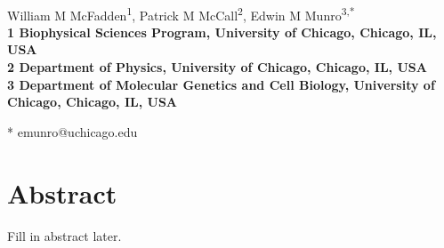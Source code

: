 \documentclass[10pt,letterpaper]{article}
\date{}
\begin{document}
\vspace*{0.35in}

\begin{flushleft}
{\Large
\textbf{}
}
\newline
\\
William M McFadden\textsuperscript{1},
Patrick M McCall\textsuperscript{2},
Edwin M Munro\textsuperscript{3,*}
\\
\bigskip
\bf{1} Biophysical Sciences Program, University of Chicago, Chicago, IL, USA
\\
\bf{2} Department of Physics, University of Chicago, Chicago, IL, USA
\\
\bf{3} Department of Molecular Genetics and Cell Biology, University of Chicago, Chicago, IL, USA
\\
\bigskip

% 
%





* emunro@uchicago.edu

\end{flushleft}
\section*{Abstract}
Fill in abstract later.
\end{document}
